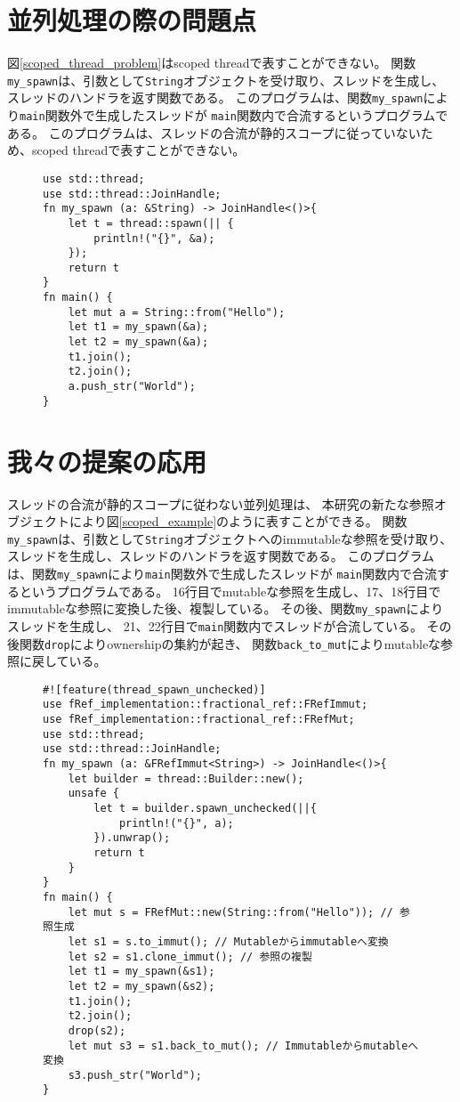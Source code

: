 \documentclass{sumiilab-paper}
\theoremstyle{mystyle}
\numberwithin{definition}{chapter} %
\begin{document}
\section{並列処理の際の問題点}
図\ref{scoped_thread_problem}はscoped threadで表すことができない。
関数\texttt{my\_spawn}は、引数として\texttt{String}オブジェクトを受け取り、スレッドを生成し、
スレッドのハンドラを返す関数である。
このプログラムは、関数\texttt{my\_spawn}により\texttt{main}関数外で生成したスレッドが
\texttt{main}関数内で合流するというプログラムである。
このプログラムは、スレッドの合流が静的スコープに従っていないため、scoped threadで表すことができない。
\begin{figure}[htp]
\begin{lstlisting}[caption=scoped threadで表せない例, 
  label=scoped_thread_problem, captionpos=b]
use std::thread;
use std::thread::JoinHandle;
fn my_spawn (a: &String) -> JoinHandle<()>{
    let t = thread::spawn(|| {
        println!("{}", &a);
    });
    return t
}
fn main() {
    let mut a = String::from("Hello");
    let t1 = my_spawn(&a);
    let t2 = my_spawn(&a);
    t1.join();
    t2.join();
    a.push_str("World");
}
\end{lstlisting}
\end{figure}

\section{我々の提案の応用}
スレッドの合流が静的スコープに従わない並列処理は、
本研究の新たな参照オブジェクトにより図\ref{scoped_example}のように表すことができる。
関数\texttt{my\_spawn}は、引数として\texttt{String}オブジェクトへのimmutableな参照を受け取り、
スレッドを生成し、スレッドのハンドラを返す関数である。
このプログラムは、関数\texttt{my\_spawn}により\texttt{main}関数外で生成したスレッドが
\texttt{main}関数内で合流するというプログラムである。
16行目でmutableな参照を生成し、17、18行目でimmutableな参照に変換した後、複製している。
その後、関数\texttt{my\_spawn}によりスレッドを生成し、
21、22行目で\texttt{main}関数内でスレッドが合流している。
その後関数\texttt{drop}によりownershipの集約が起き、
関数\texttt{back\_to\_mut}によりmutableな参照に戻している。
\begin{figure}[htp]
\begin{lstlisting}[caption=新たな参照オブジェクトを用いた並列処理の例, 
  label=scoped_example, captionpos=b]
#![feature(thread_spawn_unchecked)]
use fRef_implementation::fractional_ref::FRefImmut;
use fRef_implementation::fractional_ref::FRefMut;
use std::thread;
use std::thread::JoinHandle;
fn my_spawn (a: &FRefImmut<String>) -> JoinHandle<()>{
    let builder = thread::Builder::new();
    unsafe {
        let t = builder.spawn_unchecked(||{
            println!("{}", a);
        }).unwrap();
        return t
    }
}
fn main() {
    let mut s = FRefMut::new(String::from("Hello")); // 参照生成
    let s1 = s.to_immut(); // Mutableからimmutableへ変換
    let s2 = s1.clone_immut(); // 参照の複製
    let t1 = my_spawn(&s1);
    let t2 = my_spawn(&s2); 
    t1.join();
    t2.join();
    drop(s2);
    let mut s3 = s1.back_to_mut(); // Immutableからmutableへ変換
    s3.push_str("World");
}
\end{lstlisting}
\end{figure}
\end{document}
